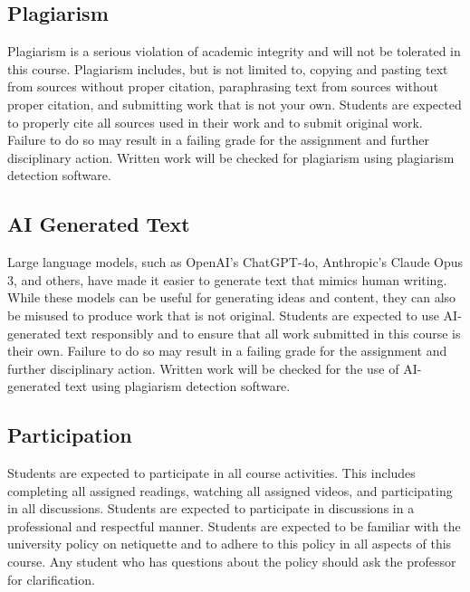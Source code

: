 \documentclass[12pt, letterpaper]{article}
\begin{document}
\subsection*{Plagiarism}
Plagiarism is a serious violation of academic integrity and will not be tolerated in this course. Plagiarism includes, but is not limited to, copying and pasting text from sources without proper citation, paraphrasing text from sources without proper citation, and submitting work that is not your own. Students are expected to properly cite all sources used in their work and to submit original work. Failure to do so may result in a failing grade for the assignment and further disciplinary action. Written work will be checked for plagiarism using plagiarism detection software.

\subsection*{AI Generated Text} 
Large language models, such as OpenAI's ChatGPT-4o, Anthropic's Claude Opus 3, and others, have made it easier to generate text that mimics human writing. While these models can be useful for generating ideas and content, they can also be misused to produce work that is not original. Students are expected to use AI-generated text responsibly and to ensure that all work submitted in this course is their own. Failure to do so may result in a failing grade for the assignment and further disciplinary action. Written work will be checked for the use of AI-generated text using plagiarism detection software.

\subsection*{Participation}

Students are expected to participate in all course activities. This includes completing all assigned readings, watching all assigned videos, and participating in all discussions. Students are expected to participate in discussions in a professional and respectful manner. Students are expected to be familiar with the university policy on netiquette and to adhere to this policy in all aspects of this course. Any student who has questions about the policy should ask the professor for clarification. 
\end{document}
